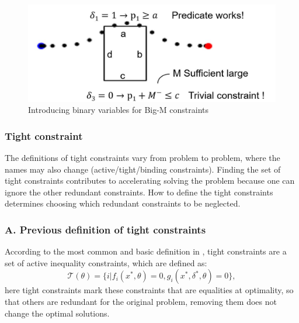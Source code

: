 \documentclass[a4paper]{report}
\begin{document}
\begin{figure}
    \vspace{0.5cm}
    \centering
    \includegraphics[scale=0.4]{big_m.jpg}
    \vspace{-0.4cm}
    \caption{Introducing binary variables for Big-M constraints}
    \label{big_M}
    \vspace{-0.6cm}
\end{figure}

\subsubsection*{Tight constraint}
The definitions of tight constraints vary from problem to problem, where the names may also change (active/tight/binding constraints).    Finding the set of tight constraints contributes to accelerating solving the problem because one can ignore the other redundant constraints.  How to define the tight constraints determines choosing which redundant constraints to be neglected.
\subsubsection*{A. Previous definition of tight constraints}
According to the most common and basic definition in \cite[]{bertsimas2022online}, tight constraints are a set of active inequality constraints, which are defined as:
\begin{equation}
\label{tight1}
    \mathcal{T}(\theta)= \{i|f_i(x^*,\theta)=0,g_i(x^*,\delta^*,\theta)=0\},
\end{equation}
here tight constraints mark these constraints that are equalities at optimality, so that others are redundant for the original problem, removing them does not change the optimal solutions. 

\end{document}
